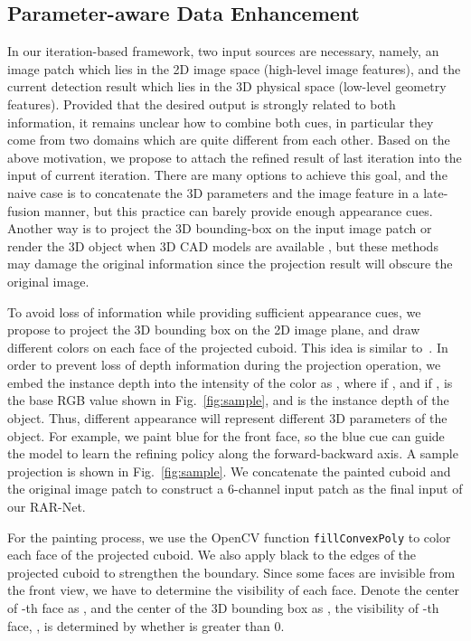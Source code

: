 \documentclass[runningheads]{llncs}
\begin{document}
\subsection{Parameter-aware Data Enhancement}

In our iteration-based framework, two input sources are necessary, namely, an image patch which lies in the 2D image space (high-level image features), and the current detection result which lies in the 3D physical space (low-level geometry features). Provided that the desired output is strongly related to both information, it remains unclear how to combine both cues, in particular they come from two domains which are quite different from each other. 
Based on the above motivation, we propose to attach the refined result of last iteration into the input of current iteration. There are many options to achieve this goal, and the naive case is to concatenate the 3D parameters and the image feature in a late-fusion manner, but this practice can barely provide enough appearance cues. Another way is to project the 3D bounding-box on the input image patch \cite{liu2019deep} or render the 3D object when 3D CAD models are available \cite{kundu20183d}, but these methods may damage the original information since the projection result will obscure the original image. 

To avoid loss of information while providing sufficient appearance cues, we propose to project the 3D bounding box on the 2D image plane, and draw different colors on each face of the projected cuboid. This idea is similar to~\cite{ren2018deep}. In order to prevent loss of depth information during the projection operation, we embed the instance depth into the intensity of the color as , where  if , and  if ,  is the base RGB value shown in Fig.~\ref{fig:sample}, and  is the instance depth of the object. Thus, different appearance will represent different 3D parameters of the object. For example, we paint blue for the front face, so the blue cue can guide the model to learn the refining policy along the forward-backward axis. A sample projection is shown in Fig.~\ref{fig:sample}. We concatenate the painted cuboid and the original image patch to construct a 6-channel input patch as the final input of our RAR-Net.

For the painting process, we use the OpenCV function {\tt{fillConvexPoly}} to color each face of the projected cuboid. We also apply black to the edges of the projected cuboid to strengthen the boundary. Since some faces are invisible from the front view, we have to determine the visibility of each face. Denote the center of -th face as , and the center of the 3D bounding box as , the visibility of -th face, , is determined by whether  is greater than 0.
\end{document}
